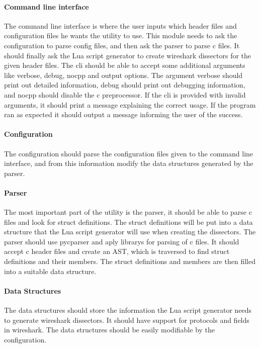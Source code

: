 \paragraph{Command line interface}
The command line interface is where the user inputs which \gls{header} files and
configuration files he wants the \gls{utility} to use. This module needs to ask
the configuration to parse config files, and then ask the parser to parse \Gls{c}
files. It should finally ask the Lua script generator to create \Gls{wireshark} \glspl{dissector}
for the given \gls{header} files. The \gls{cli} should be able to accept some additional
arguments like verbose, debug, nocpp and output options.
The argument verbose should print out detailed information,
debug should print out debugging information, and nocpp should
disable the \Gls{c} \gls{preprocessor}. If the \gls{cli} is provided with invalid arguments, 
it should print a message explaining the correct usage.
If the program ran as expected it should output a message informing
the user of the success. 

\paragraph{Configuration}
The configuration should parse the configuration files given
to the command line interface, and from this information modify
the data structures generated by the parser.

\paragraph{Parser}
The most important part of the utility is the \gls{parser}, it should be able to parse \Gls{c} files and
look for \gls{struct} definitions. The \gls{struct} definitions will be put into a data structure
that the Lua script generator will use when creating the \glspl{dissector}.
The parser should use \gls{pycparser} and \gls{aply} \glspl{library} for parsing of \Gls{c} files. It should accept \Gls{c}
\gls{header} files and create an \gls{AST}, which is traversed
to find \gls{struct} definitions and their \glspl{member}. The \gls{struct} definitions and \glspl{member}
are then filled into a suitable data structure.

\paragraph{Data Structures}
The data structures should store the information the Lua script generator needs to generate
\Gls{wireshark} \glspl{dissector}. It should have support for protocols and fields in \Gls{wireshark}.
The data structures should be easily modifiable by the configuration.


